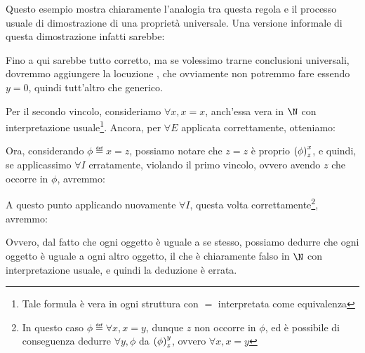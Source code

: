 Questo esempio mostra chiaramente l'analogia tra questa regola e il processo usuale di dimostrazione di una proprietà universale. Una versione informale di questa dimostrazione infatti sarebbe:
\begin{quote}
\end{quote}

Fino a qui sarebbe tutto corretto, ma se volessimo trarne conclusioni universali, dovremmo aggiungere la locuzione , che ovviamente non potremmo fare essendo \(y=0\), quindi tutt'altro che generico.

Per il secondo vincolo, consideriamo \(\forall x, x=x\), anch'essa vera in \(\N\) con interpretazione usuale\footnote{Tale formula è vera in ogni struttura con \(=\) interpretata come equivalenza}. Ancora, per \(\forall E\) applicata correttamente, otteniamo:

\begin{prooftree}
\end{prooftree}

Ora, considerando \(\phi \eqdef x=z\), possiamo notare che \(z=z\) è proprio \({{\left(\phi\right)}^{x}_{z}}\), e quindi, se applicassimo \(\forall I\) erratamente, violando il primo vincolo, ovvero avendo \(z\) che occorre in \(\phi\), avremmo:
\begin{prooftree}
\end{prooftree}

A questo punto applicando nuovamente \(\forall I\), questa volta correttamente\footnote{In questo caso \(\phi \eqdef \forall x, x=y\), dunque \(z\) non occorre in \(\phi\), ed è possibile di conseguenza dedurre \(\forall y, \phi\) da \({{\left(\phi\right)}^{y}_{z}}\), ovvero \(\forall x, x=y\)}, avremmo:
\begin{prooftree}
\end{prooftree}
Ovvero, dal fatto che ogni oggetto è uguale a se stesso, possiamo dedurre che ogni oggetto è uguale a ogni altro oggetto, il che è chiaramente falso in \(\N\) con interpretazione usuale, e quindi la deduzione è errata.

